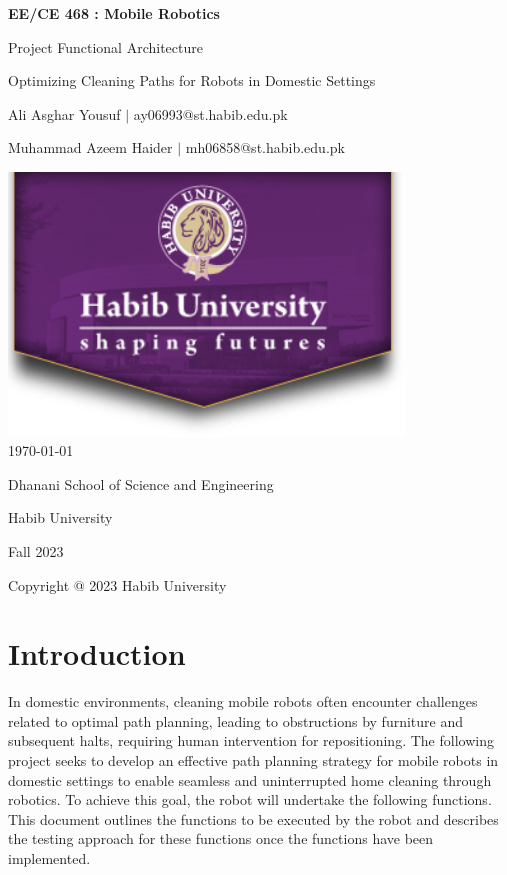 \documentclass[12pt]{article}
\begin{document}
\begin{titlepage}
    \centering
    {\LARGE\textbf{EE/CE 468 : Mobile Robotics}\par}
    \vspace{0.5cm}
    {\Large Project Functional Architecture\par}
    \vspace{0.2cm}
    {\Large Optimizing Cleaning Paths for Robots in Domestic Settings\par}
    \vspace*{\fill} %
    {\large Ali Asghar Yousuf $\mid$ ay06993@st.habib.edu.pk\par}
    {\large Muhammad Azeem Haider $\mid$ mh06858@st.habib.edu.pk\par}
    \vspace{2cm}
    \includegraphics[height=7cm]{../HU_logo}\\\bigskip
    {\large \today}\\\bigskip\bigskip
    \vspace{1cm}
    \vspace{2cm}
    {\large Dhanani School of Science and Engineering\par}
    {\large Habib University\par}
    {\large Fall 2023\par}
    \vspace*{\fill} %
    {\large Copyright @ 2023 Habib University\par}
\end{titlepage}

\thispagestyle{empty} %
\tableofcontents
\clearpage

\section{Introduction}
In domestic environments, cleaning mobile robots often encounter challenges related to optimal path planning, leading to obstructions by furniture and subsequent halts, requiring human intervention for repositioning. The following project seeks to develop an effective path planning strategy for mobile robots in domestic settings to enable seamless and uninterrupted home cleaning through robotics. To achieve this goal, the robot will undertake the following functions. This document outlines the functions to be executed by the robot and describes the testing approach for these functions once the functions have been implemented.
\end{document}
